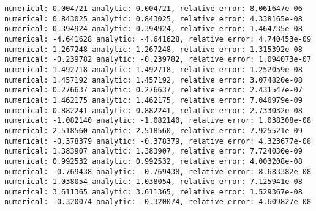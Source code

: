 \documentclass[11pt]{article}
\begin{document}
    \begin{Verbatim}[commandchars=\\\{\}]
numerical: 0.004721 analytic: 0.004721, relative error: 8.061647e-06
numerical: 0.843025 analytic: 0.843025, relative error: 4.338165e-08
numerical: 0.394924 analytic: 0.394924, relative error: 1.464735e-08
numerical: -4.641628 analytic: -4.641628, relative error: 4.740453e-09
numerical: 1.267248 analytic: 1.267248, relative error: 1.315392e-08
numerical: -0.239782 analytic: -0.239782, relative error: 1.094073e-07
numerical: 1.492718 analytic: 1.492718, relative error: 1.252059e-08
numerical: 1.457192 analytic: 1.457192, relative error: 3.074820e-08
numerical: 0.276637 analytic: 0.276637, relative error: 2.431547e-07
numerical: 1.462175 analytic: 1.462175, relative error: 7.040979e-09
numerical: 0.882241 analytic: 0.882241, relative error: 2.733032e-08
numerical: -1.082140 analytic: -1.082140, relative error: 1.038308e-08
numerical: 2.518560 analytic: 2.518560, relative error: 7.925521e-09
numerical: -0.378379 analytic: -0.378379, relative error: 4.323677e-08
numerical: 1.383907 analytic: 1.383907, relative error: 7.724030e-09
numerical: 0.992532 analytic: 0.992532, relative error: 4.003208e-08
numerical: -0.769438 analytic: -0.769438, relative error: 8.683382e-08
numerical: 1.038054 analytic: 1.038054, relative error: 7.125941e-08
numerical: 3.611365 analytic: 3.611365, relative error: 1.529367e-08
numerical: -0.320074 analytic: -0.320074, relative error: 4.609827e-08
    \end{Verbatim}
\end{document}
